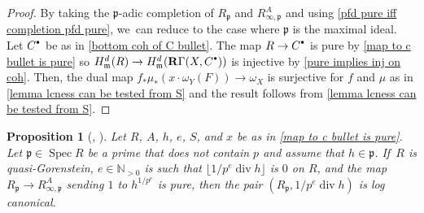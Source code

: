 \documentclass[JEP,XML,SOM,Unicode,published]{cedram}
\let\autoref\cref
\newcommand{\sbullet}{{\scriptscriptstyle\bullet}}
\newcommand{\csbullet}{{\raisebox{1pt}{$\sbullet$}}}
\theoremstyle{plain}
\newtheorem{proposition}[theorem]{Proposition}
\theoremstyle{definition}
\numberwithin{equation}{theorem}
\newcommand{\N}{\mathbb {N}}
\newcommand{\fram}{\mathfrak{m}}
\newcommand{\p}{\mathfrak{p}}
\DeclareMathOperator{\Div}{{div}}
\DeclareMathOperator{\Spec}{{Spec}}
\newcommand{\unpe}{{1/{p^e}}}
\newcommand{\rgamma}{\mathbf{R}\Gamma}
\begin{document}
\begin{proof}
By taking the $\p$-adic completion of $R_\p$ and $R^A_{\infty,\p}$ and using \autoref{pfd pure iff completion pfd pure}, we~can reduce to the case where $\p$ is the maximal ideal.
Let $C^\csbullet$ be as in \autoref{bottom coh of C bullet}.
The map $R\to C^\csbullet$ is pure by \autoref{map to c bullet is pure} so $H_\fram^d(R)\to H_\fram^d(\rgamma(X,C^\csbullet))$ is injective by \autoref{pure implies inj on coh}.
Then,
the dual map $f_* \mu_*(x\cdot \omega_Y(F))\to \omega_X$ is surjective for $f$ and $\mu$ as in \autoref{lemma lcness can be tested from S} and the result follows from \autoref{lemma lcness can be tested from S}.
\end{proof}

\begin{proposition}[{\cf \cite[Prop.\,5.4]{BMPSTWWPerfectoidPure}, \cite{KovacsSchwedeSmithLCImpliesDuBois}}]\label{lc implies log canonical}
Let $R$, $A$, $h$, $e$, $S$, and $x$ be as in \autoref{map to c bullet is pure}. Let $\p\in \Spec R$ be a prime that does not contain $p$ and assume that $h\in \p$. If~$R$ is quasi-Gorenstein, $e\in \N_{>0}$ is such that $\lfloor \unpe\Div h \rfloor$ is $0$ on $R$, and
the map $R_\p\to R^A_{\infty,\p}$ sending $1$ to $h^\unpe$ is pure, then the pair $(R_\p,\unpe \Div h)$ is log canonical.
\end{proposition}
\end{document}
